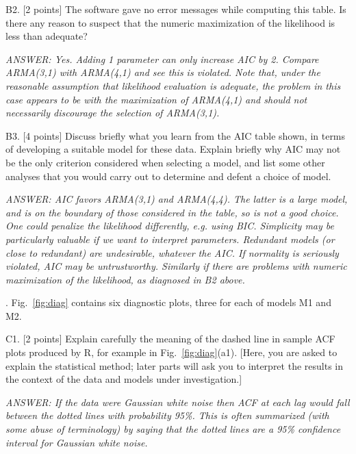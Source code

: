 \documentclass[11pt]{article}
\def\qspace{\vspace{1.5in}}
\def\ans{\it ANSWER: }
\begin{document}
B2. [2 points] The software gave no error messages while computing this
table. Is there any reason to suspect that the numeric
maximization of the likelihood is less than adequate?

{\ans Yes. Adding 1 parameter can only increase AIC by 2. Compare
ARMA(3,1) with ARMA(4,1) and see this is violated. Note that, under the reasonable assumption that likelihood evaluation is adequate, the problem in this case appears to be with the maximization of ARMA(4,1) and should not necessarily discourage the selection of ARMA(3,1).}


B3. [4 points] Discuss briefly what you learn from the AIC table shown, in terms of developing a suitable model for these data.
Explain briefly why AIC may not be the only criterion
considered when selecting a model, and list some other analyses that you would carry out to determine and defent a choice of model.

{\ans AIC favors ARMA(3,1) and ARMA(4,4). The latter is a large model, and is on the boundary of those considered  in the table, so is not a good choice. One could penalize the likelihood differently, e.g. using
BIC. Simplicity may be particularly valuable if we want to
interpret parameters. Redundant models (or close to redundant)
are undesirable, whatever the AIC. If normality is seriously violated, AIC
may be untrustworthy. Similarly if there are problems with
numeric maximization of the likelihood, as diagnosed in B2 above.}


. Fig.~\ref{fig:diag} contains six diagnostic plots, three for each of models M1 and M2.

C1. [2 points] Explain carefully the meaning of the dashed line in sample
ACF plots produced by R, for example in Fig.~\ref{fig:diag}(a1). [Here, you are asked to explain the statistical method; later parts will ask you to interpret the results in the context of the data and models under investigation.]

{\ans If the data were Gaussian white noise then ACF at each lag would fall between the dotted lines with probability 95\%. This is often summarized (with some abuse of terminology) by saying that the dotted lines are a 95\% confidence interval for Gaussian white noise.}

\end{document}
